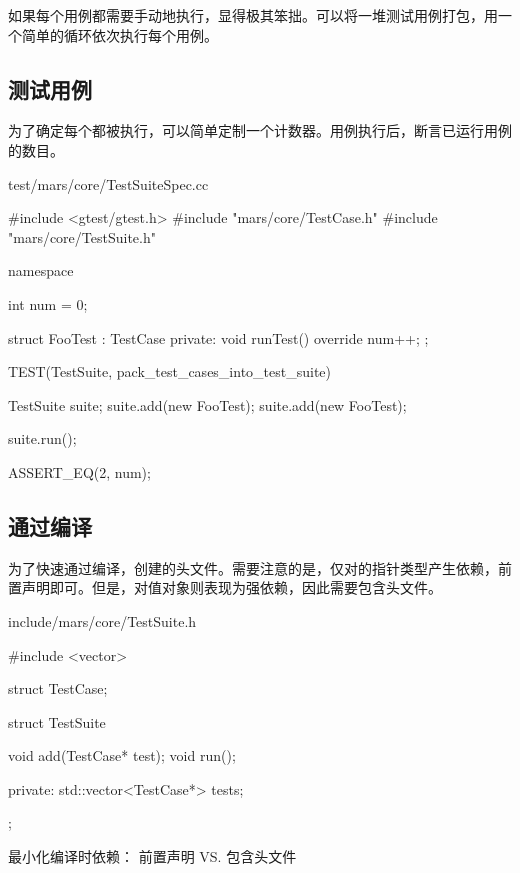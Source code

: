 \begin{content}

如果每个用例都需要手动地执行，显得极其笨拙。可以将一堆测试用例打包，用一个简单的循环依次执行每个用例。

\subsection{测试用例}

为了确定每个都被执行，可以简单定制一个计数器。用例执行后，断言已运行用例的数目。

\begin{nodiff}{test/mars/core/TestSuiteSpec.cc}
 \begin{c++}
#include <gtest/gtest.h>
#include "mars/core/TestCase.h"
#include "mars/core/TestSuite.h"

namespace {
  int num = 0;

  struct FooTest : TestCase {
  private:
    void runTest() override {
      num++;
    }
  };
}

TEST(TestSuite, pack_test_cases_into_test_suite) {
  TestSuite suite;
  suite.add(new FooTest);
  suite.add(new FooTest);

  suite.run();

  ASSERT_EQ(2, num);
}
 \end{c++}
\end{nodiff}

\subsection{通过编译}

为了快速通过编译，创建的头文件。需要注意的是，仅对的指针类型产生依赖，前置声明即可。但是，对值对象则表现为强依赖，因此需要包含头文件。

\begin{nodiff}{include/mars/core/TestSuite.h}
 \begin{c++}
#include <vector>

struct TestCase;

struct TestSuite {
  void add(TestCase* test);
  void run();

private:
  std::vector<TestCase*> tests;
};
 \end{c++}
\end{nodiff}

\begin{episode}{最小化编译时依赖： 前置声明 VS. 包含头文件}


\end{episode}
\end{content}
